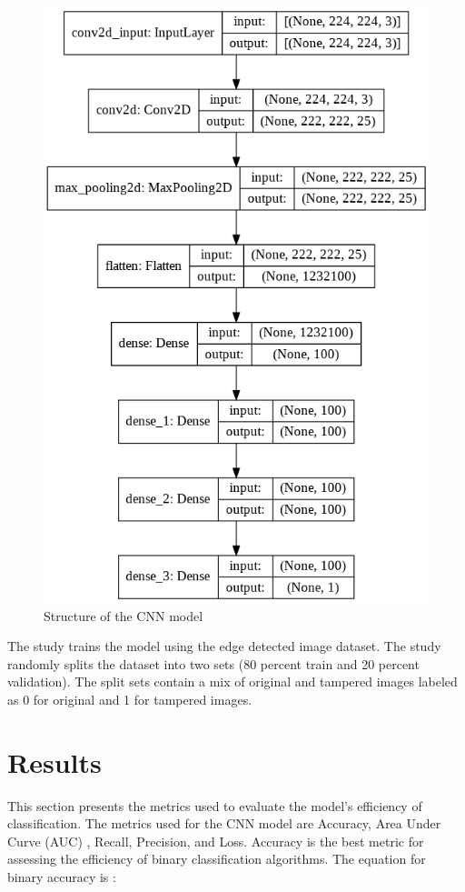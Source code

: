\documentclass[conference]{IEEEtran}
\begin{document}
\begin{figure}[htpb]
\centerline{\includegraphics[scale = 0.31]{model.png}}
\caption{Structure of the CNN model}
\label{model}
\end{figure}

The study trains the model using the edge detected image dataset. The study randomly splits the dataset into two sets (80 percent train and 20 percent validation). The split sets contain a mix of original and tampered images labeled as 0 for original and 1 for tampered images. 

\section{Results}
This section presents the metrics used to evaluate the model's efficiency of classification. The metrics used for the CNN model are Accuracy, Area Under Curve (AUC) \cite{b12}, Recall, Precision, and Loss. Accuracy is the best metric for assessing the efficiency of binary classification algorithms. The equation for binary accuracy is :
\end{document}
